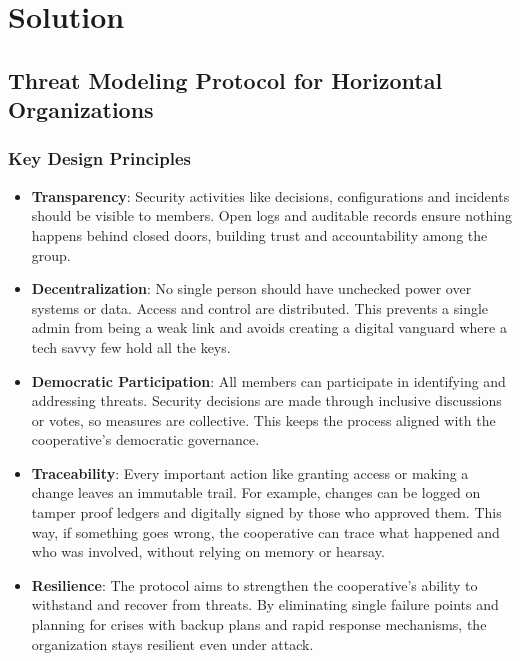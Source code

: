 
%

\chapter{Solution}
\label{cha:solution}


\glsresetall
 
\section{Threat Modeling Protocol for Horizontal Organizations}
\label{sec:protocol}

\subsection{Key Design Principles}
\label{subsec:key_principles}

\begin{itemize}
    \item \textbf{Transparency}: Security activities like decisions,
configurations and incidents should be visible to members. Open logs and
auditable records ensure nothing happens behind closed doors, building trust
and accountability among the group.
    \item \textbf{Decentralization}: No single person should have unchecked
power over systems or data. Access and control are distributed. This prevents a
single admin from being a weak link and avoids creating a digital vanguard
where a tech savvy few hold all the keys.
    \item \textbf{Democratic Participation}: All members can participate in
identifying and addressing threats. Security decisions are made through
inclusive discussions or votes, so measures are collective. This keeps
the process aligned with the cooperative's democratic governance.
    \item \textbf{Traceability}: Every important action like granting access or making
a change leaves an immutable trail. For example, changes can be logged on
tamper proof ledgers and digitally signed by those who approved them. This way,
if something goes wrong, the cooperative can trace what happened and who was involved,
without relying on memory or hearsay.
    \item \textbf{Resilience}: The protocol aims to strengthen the cooperative's
ability to withstand and recover from threats. By eliminating single failure
points and planning for crises with backup plans and rapid response
mechanisms, the organization stays resilient even under attack.
\end{itemize}

